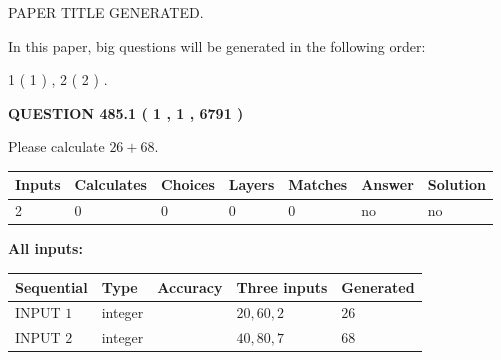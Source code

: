 \documentclass[12pt]{article}
\begin{document}
   
\vspace{0.2in}
   
   
   
   
   
   
   
   
 \vspace{0.2in}
 
 
 
 
   
   
 PAPER TITLE GENERATED.
   
   
   
\vspace{0.2in}
   
In this paper, big questions will be generated in the following order: 
   
   
   1 ( 1 )
 ,
   2 ( 2 )
 .
  
\vspace{0.2in}
  
{\textbf{\Large{QUESTION
485.1 
 ( 1 , 1 , 6791 )
}}}
  
  
 
Please calculate $ %
26 +  %
68 $.
 
 
   
   
   
   
\noindent\begin{tabular}{|l|l|l|l|l|l|l|}
 \hline
Inputs & Calculates & Choices & Layers & Matches & Answer & Solution \\ \hline
 2  & 
 0  & 
 0
  & 
 0  & 
 0  & 
  no & 
  no 
  \\ \hline
 \end{tabular}
   
   
   
   
\noindent{}
   
   
   
   
\noindent\vspace{0.1in}\hspace{-0.08in} {\textbf{\Large{All inputs: }}}
   
   
  
  
\noindent\begin{tabular}{|l|l|l|l|l|}
\hline
 Sequential & Type & Accuracy & Three inputs & Generated \\ 
\hline
 
 
  INPUT $  1 $ & integer &  & $
 20
 , 
 60
 , 
 2
 $ & $ 26 $ 
 \\  \hline  
 
 
  INPUT $  2 $ & integer &  & $
 40
 , 
 80
 , 
 7
 $ & $ 68 $ 
 \\  \hline  
 \end{tabular}
   
\end{document}
